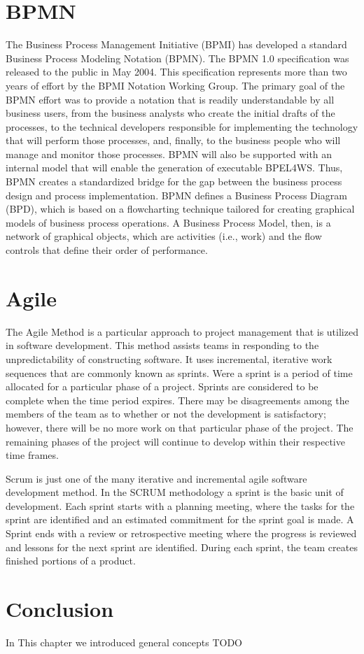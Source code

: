 \section{BPMN}
The Business Process Management Initiative (BPMI) has developed a standard
Business Process Modeling Notation (BPMN). The BPMN 1.0 specification was
released to the public in May 2004. This specification represents more than two
years of effort by the BPMI Notation Working Group. The primary goal of the BPMN
effort was to provide a notation that is readily understandable by all business
users, from the business analysts who create the initial drafts of the
processes, to the technical developers responsible for implementing the
technology that will perform those processes, and, finally, to the business
people who will manage and monitor those processes. BPMN will also be supported
with an internal model that will enable the generation of executable BPEL4WS.
Thus, BPMN creates a standardized bridge for the gap between the business
process design and process implementation.
BPMN defines a Business Process Diagram (BPD), which is based on a flowcharting
technique tailored for creating graphical models of business process operations.
A Business Process Model, then, is a network of graphical objects, which are
activities (i.e., work) and the flow controls that define their order of
performance.


\section{Agile}
The Agile Method is a particular approach to project management that is utilized
in software development. This method assists teams in responding to the
unpredictability of constructing software. It uses incremental, iterative work
sequences that are commonly known as sprints. Were a sprint is a period of time
allocated for a particular phase of a project. Sprints are considered to be
complete when the time period expires. There may be disagreements among the
members of the team as to whether or not the development is satisfactory;
however, there will be no more work on that particular phase of the project. The
remaining phases of the project will continue to develop within their respective
time frames.

Scrum is just one of the many iterative and incremental agile software
development method. In the SCRUM methodology a sprint is the basic unit of
development. Each sprint starts with a planning meeting, where the tasks for the
sprint are identified and an estimated commitment for the sprint goal is made. A
Sprint ends with a review or retrospective meeting where the progress is
reviewed and lessons for the next sprint are identified. During each sprint, the
team creates finished portions of a product.

\section*{Conclusion}
In This chapter we introduced general concepts
TODO
